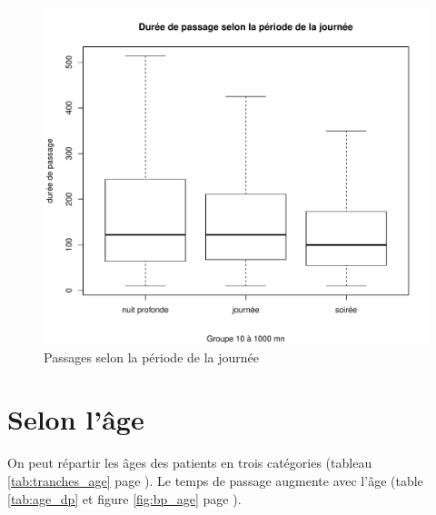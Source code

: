 \documentclass[12pt,english,french,twoside]{book}\usepackage[]{graphicx}\usepackage[]{color}
\makeatletter
\def\maxwidth{ %
  \ifdim\Gin@nat@width>\linewidth
    \linewidth
  \else
    \Gin@nat@width
  \fi
}
\newenvironment{knitrout}{}{} %
\makeatother
\begin{document}
\begin{figure}[ht!]
 \centering
\begin{knitrout}
\color{fgcolor}
\includegraphics[width=\maxwidth]{figure/periode_4} 

\end{knitrout}

 \caption{Passages selon la période de la journée}
\end{figure}



\section{Selon l'âge}

On peut répartir les âges des patients en trois catégories (tableau \ref{tab:tranches_age} page \pageref{tab:tranches_age}). Le temps de passage augmente avec l'âge (table \ref{tab:age_dp} et figure \ref{fig:bp_age} page \pageref{fig:bp_age}).

\end{document}
